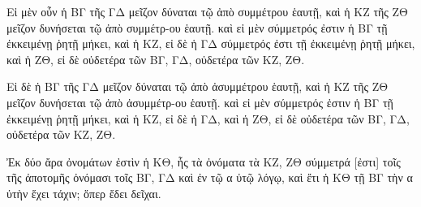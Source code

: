 \begin{Parallel}{}{}
{{\greekfont Εἰ μὲν οὖν ἡ ΒΓ τῆς ΓΔ μεῖζον δύναται τῷ ἀπὸ
συμμέτρου ἑαυτῇ, καὶ ἡ ΚΖ τῆς ΖΘ μεῖζον δυνήσεται
τῷ ἀπὸ συμμέτρ-ου ἑαυτῇ. καὶ εἰ μὲν σύμμετρός
ἐστιν ἡ ΒΓ τῇ ἐκκειμένῃ ῥητῇ μήκει, καὶ ἡ ΚΖ, εἰ δὲ
ἡ ΓΔ σύμμετρός ἐστι τῇ ἐκκειμένῃ ῥητῇ μήκει,
καὶ ἡ ΖΘ, εἰ δὲ οὐδετέρα τῶν ΒΓ, ΓΔ, οὐδετέρα
τῶν ΚΖ, ΖΘ.}

{\greekfont Εἰ δὲ ἡ ΒΓ τῆς ΓΔ μεῖζον δύναται τῷ ἀπὸ ἀσυμμέτρου
ἑαυτῇ, καὶ ἡ ΚΖ τῆς ΖΘ μεῖζον δυνήσεται τῷ ἀπὸ
ἀσυμμέτρ-ου ἑαυτῇ. καὶ εἰ μὲν σύμμετρός ἐστιν
ἡ ΒΓ τῇ ἐκκειμένῃ ῥητῇ μήκει, καὶ ἡ ΚΖ,
εἰ δὲ ἡ ΓΔ, καὶ ἡ ΖΘ, εἰ δὲ οὐδετέρα τῶν ΒΓ, ΓΔ, οὐδετέρα
τῶν ΚΖ, ΖΘ.}

{\greekfont Ἐκ δύο ἄρα ὀνομάτων ἐστὶν ἡ ΚΘ, ἧς τὰ ὀνόματα
τὰ ΚΖ, ΖΘ σύμμετρά [ἐστι] τοῖς τῆς ἀποτομῆς ὀνόμασι
τοῖς ΒΓ, ΓΔ καὶ ἐν τῷ α ὐτῷ λόγῳ, καὶ ἔτι ἡ ΚΘ
τῇ ΒΓ τὴν α ὐτὴν ἕχει τάχιν; ὅπερ ἔδει δεῖχαι.}}

\end{Parallel}
